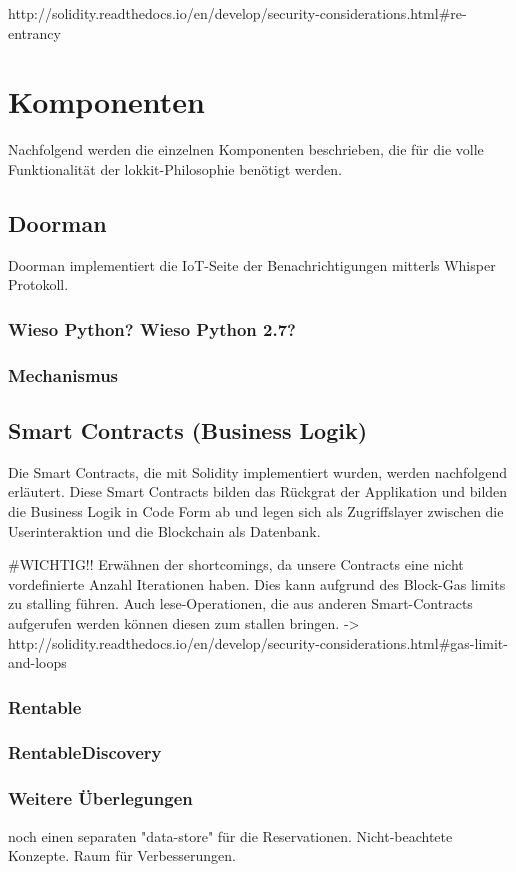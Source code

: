 http://solidity.readthedocs.io/en/develop/security-considerations.html\#re-entrancy

\section{Komponenten}
\label{sec:Komponenten}
Nachfolgend werden die einzelnen Komponenten beschrieben, die für die volle Funktionalität der lokkit-Philosophie benötigt werden.
\subsection{Doorman}
Doorman implementiert die IoT-Seite der Benachrichtigungen mitterls Whisper Protokoll.
\subsubsection{Wieso Python? Wieso Python 2.7?}
\subsubsection{Mechanismus}

\subsection{Smart Contracts (Business Logik)}
Die Smart Contracts, die mit Solidity implementiert wurden, werden nachfolgend erläutert. Diese Smart Contracts bilden das Rückgrat der Applikation und bilden die Business Logik in Code Form ab und legen sich als Zugriffslayer zwischen die Userinteraktion und die Blockchain als Datenbank.

\#WICHTIG!!
Erwähnen der shortcomings, da unsere Contracts eine nicht vordefinierte Anzahl Iterationen haben. Dies kann aufgrund des Block-Gas limits zu stalling führen. Auch lese-Operationen, die aus anderen Smart-Contracts aufgerufen werden können diesen zum stallen bringen. -> http://solidity.readthedocs.io/en/develop/security-considerations.html\#gas-limit-and-loops

\subsubsection{Rentable}
\subsubsection{RentableDiscovery}

\subsubsection{Weitere Überlegungen}
noch einen separaten "data-store" für die Reservationen. Nicht-beachtete Konzepte. Raum für Verbesserungen.


